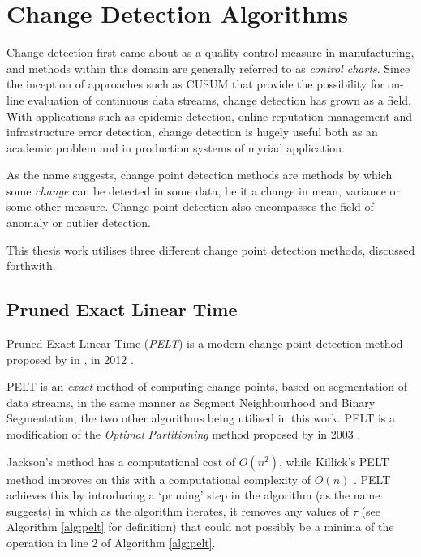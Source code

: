 \documentclass[../main.tex]{subfiles}
\begin{document}
\section{Change Detection Algorithms}

Change detection first came about as a quality control measure in manufacturing, and methods within this domain are generally referred to as \emph{control charts}. Since the inception of approaches such as CUSUM \cite{Page1954} that provide the possibility for on-line evaluation of continuous data streams, change detection has grown as a field. With applications such as epidemic detection, online reputation management and infrastructure error detection, change detection is hugely useful both as an academic problem and in production systems of myriad application.

As the name suggests, change point detection methods are methods by which some \emph{change} can be detected in some data, be it a change in mean, variance or some other measure. Change point detection also encompasses the field of anomaly or outlier detection.

This thesis work utilises three different change point detection methods, discussed forthwith.

\subsection{Pruned Exact Linear Time}

Pruned Exact Linear Time (\emph{PELT}) is a modern change point detection method proposed by \citeauthor{Killick2011a} in , in 2012 \cite{Killick2011a}.

PELT is an \emph{exact} method of computing change points, based on segmentation of data streams, in the same manner as Segment Neighbourhood and Binary Segmentation, the two other algorithms being utilised in this work. PELT is a modification of the \emph{Optimal Partitioning} method proposed by \citeauthor{Jackson2003} in 2003 \cite{Jackson2003}.

Jackson's method has a computational cost of $O(n^2)$, while Killick's PELT method improves on this with a computational complexity of $O(n)$ \cite{Killick2011a}. PELT achieves this by introducing a `pruning' step in the algorithm (as the name suggests) in which as the algorithm iterates, it removes any values of $\tau$ (see Algorithm \autoref{alg:pelt} for definition) that could not possibly be a minima of the operation in line 2 of Algorithm \autoref{alg:pelt}.
\end{document}
